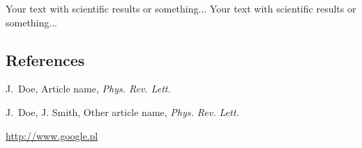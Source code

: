 \documentclass[final]{beamer}
\begin{document}
\begin{frame}[t]
\begin{multicols}{3}
Your text with scientific results or something... 
Your text with scientific results or something... 





\subsection{References}

\begin{thebibliography}{99}

 J.~Doe, Article name, \textit{Phys. Rev. Lett.}

 J.~Doe, J. Smith, Other article name, \textit{Phys. Rev. Lett.}

 \url{http://www.google.pl}

\end{thebibliography}

\end{multicols}

\end{frame}
\end{document}
